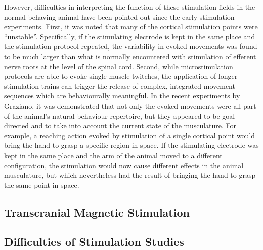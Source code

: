 However, difficulties in interpreting the function of these stimulation fields in the normal behaving animal have been pointed out since the early stimulation experiments. First, it was noted that many of the cortical stimulation points were ``unstable''. Specifically, if the stimulating electrode is kept in the same place and the stimulation protocol repeated, the variability in evoked movements was found to be much larger than what is normally encountered with stimulation of efferent nerve roots at the level of the spinal cord. Second, while microstimulation protocols are able to evoke single muscle twitches, the application of longer stimulation trains can trigger the release of complex, integrated movement sequences which are behaviourally meaningful. In the recent experiments by Graziano, it was demonstrated that not only the evoked movements were all part of the animal's natural behaviour repertoire, but they appeared to be goal-directed and to take into account the current state of the musculature. For example, a reaching action evoked by stimulation of a single cortical point would bring the hand to grasp a specific region in space. If the stimulating electrode was kept in the same place and the arm of the animal moved to a different configuration, the stimulation would now cause different effects in the animal musculature, but which nevertheless had the result of bringing the hand to grasp the same point in space.

\subsection{Transcranial Magnetic Stimulation}

\subsection{Difficulties of Stimulation Studies}
